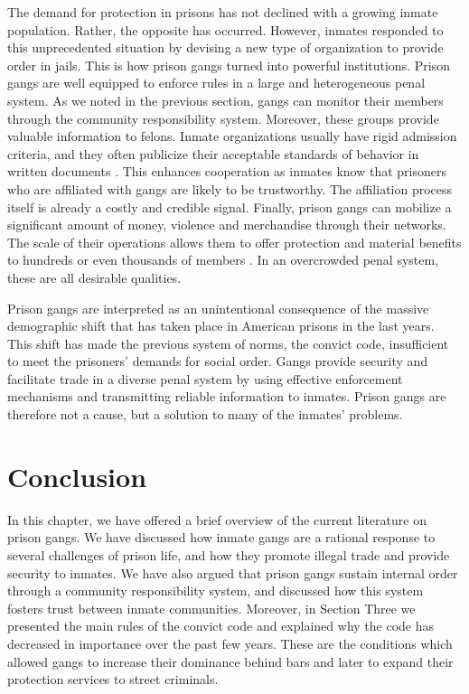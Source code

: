 \documentclass[a4paper, 12pt]{article}
\begin{document}
The demand for protection in prisons has not declined with a growing inmate population. Rather, the opposite has occurred. However, inmates responded to this unprecedented situation by devising a new type of organization to provide order in jails. This is how prison gangs turned into powerful institutions. Prison gangs are well equipped to enforce rules in a large and heterogeneous penal system. As we noted in the previous section, gangs can monitor their members through the community responsibility system. Moreover, these groups provide valuable information to felons. Inmate organizations usually have rigid admission criteria, and they often publicize their acceptable standards of behavior in written documents  \citep{skarbek2010putting,skarbek2012prison}. This enhances cooperation as inmates know that prisoners who are affiliated with gangs are likely to be trustworthy. The affiliation process itself is already a costly and credible signal. Finally, prison gangs can mobilize a significant amount of money, violence and merchandise through their networks. The scale of their operations allows them to offer protection and material benefits to hundreds or even thousands of members \citep{blatchford2008black,camp1985prison}. In an overcrowded penal system, these are all desirable qualities.

Prison gangs are interpreted as an unintentional consequence of the massive demographic shift that has taken place in American prisons in the last years. This shift has made the previous system of norms, the convict code, insufficient to meet the prisoners' demands for social order. Gangs provide security and facilitate trade in a diverse penal system by using effective enforcement mechanisms and transmitting reliable information to inmates. Prison gangs are therefore not a cause, but a solution to many of the inmates' problems.

\section{Conclusion}
\label{sec:conclusion} 

In this chapter, we have offered a brief overview of the current literature on prison gangs. We have discussed how inmate gangs are a rational response to several challenges of prison life, and how they promote illegal trade and provide security to inmates. We have also argued that prison gangs sustain internal order through a community responsibility system, and discussed how this system fosters trust between inmate communities. Moreover, in Section Three we presented the main rules of the convict code and explained why the code has decreased in importance over the past few years. These are the conditions which allowed gangs to increase their dominance behind bars and later to expand their protection services to street criminals. 
\end{document}
